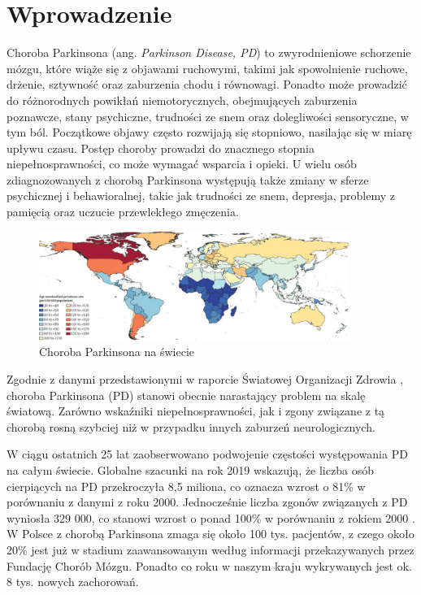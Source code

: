 \chapter{Wprowadzenie} \label{ch:wprowadzenie}

Choroba Parkinsona (ang. \emph {Parkinson Disease, PD}) to zwyrodnieniowe schorzenie mózgu, które wiąże się z objawami ruchowymi, takimi jak spowolnienie ruchowe,
drżenie, sztywność oraz zaburzenia chodu i równowagi.
Ponadto może prowadzić do różnorodnych powikłań niemotorycznych, obejmujących zaburzenia poznawcze, stany psychiczne,
trudności ze snem oraz dolegliwości sensoryczne, w tym ból.
Początkowe objawy często rozwijają się stopniowo, nasilając się w miarę upływu czasu.
Postęp choroby prowadzi do znacznego stopnia niepełnosprawności, co może wymagać wsparcia i opieki.
U wielu osób zdiagnozowanych z chorobą Parkinsona występują także zmiany w sferze psychicznej i behawioralnej, takie jak
trudności ze snem, depresja, problemy z pamięcią oraz uczucie przewlekłego zmęczenia.

\begin{figure}[htbp]
	\centering
	\includegraphics[width=0.9\textwidth]{./img/map}
	\caption{Choroba Parkinsona na świecie \cite{global_PD}}
    \label{fig:PD_map}
\end{figure}

Zgodnie z danymi przedstawionymi w raporcie Światowej Organizacji Zdrowia \cite{WHO}, choroba Parkinsona (PD) stanowi obecnie narastający problem na skalę światową. Zarówno wskaźniki niepełnosprawności, jak i zgony związane z tą chorobą rosną szybciej niż w przypadku innych zaburzeń neurologicznych.

W ciągu ostatnich 25 lat zaobserwowano podwojenie częstości występowania PD na całym świecie.
Globalne szacunki na rok 2019 wskazują, że liczba osób cierpiących na PD przekroczyła 8,5 miliona, co oznacza wzrost o 81\% w porównaniu z danymi z roku 2000.
Jednocześnie liczba zgonów związanych z PD wyniosła 329 000, co stanowi wzrost o ponad 100\% w porównaniu z rokiem 2000 \cite{global_PD}.
W Polsce z chorobą Parkinsona zmaga się około 100 tys. pacjentów, z czego około 20\% jest już w stadium zaawansowanym
według informacji przekazywanych przez Fundację Chorób Mózgu.
Ponadto co roku w naszym kraju wykrywanych jest ok. 8 tys. nowych zachorowań.

